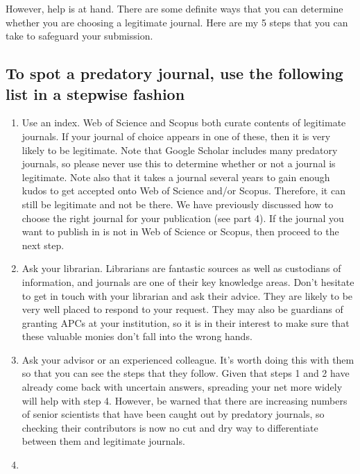 \documentclass[
]{krantz}
\providecommand{\tightlist}{%
  \setlength{\itemsep}{0pt}\setlength{\parskip}{0pt}}
\begin{document}
However, help is at hand. There are some definite ways that you can determine whether you are choosing a legitimate journal. Here are my 5 steps that you can take to safeguard your submission.

\hypertarget{to-spot-a-predatory-journal-use-the-following-list-in-a-stepwise-fashion}{%
\subsection{To spot a predatory journal, use the following list in a stepwise fashion}\label{to-spot-a-predatory-journal-use-the-following-list-in-a-stepwise-fashion}}

\begin{enumerate}
\def\labelenumi{\arabic{enumi}.}
\tightlist
\item
  Use an index. Web of Science and Scopus both curate contents of legitimate journals. If your journal of choice appears in one of these, then it is very likely to be legitimate. Note that Google Scholar includes many predatory journals, so please never use this to determine whether or not a journal is legitimate. Note also that it takes a journal several years to gain enough kudos to get accepted onto Web of Science and/or Scopus. Therefore, it can still be legitimate and not be there. We have previously discussed how to choose the right journal for your publication (see part 4). If the journal you want to publish in is not in Web of Science or Scopus, then proceed to the next step.
\item
  Ask your librarian. Librarians are fantastic sources as well as custodians of information, and journals are one of their key knowledge areas. Don't hesitate to get in touch with your librarian and ask their advice. They are likely to be very well placed to respond to your request. They may also be guardians of granting APCs at your institution, so it is in their interest to make sure that these valuable monies don't fall into the wrong hands.
\item
  Ask your advisor or an experienced colleague. It's worth doing this with them so that you can see the steps that they follow. Given that steps 1 and 2 have already come back with uncertain answers, spreading your net more widely will help with step 4. However, be warned that there are increasing numbers of senior scientists that have been caught out by predatory journals, so checking their contributors is now no cut and dry way to differentiate between them and legitimate journals.
\item

\end{enumerate}
\end{document}
